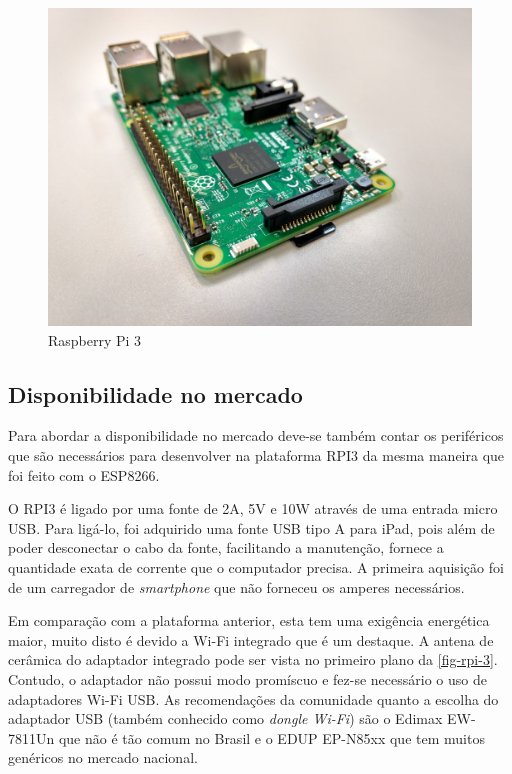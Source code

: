 \begin{figure}[htb]
	\caption{\label{fig-rpi-3}Raspberry Pi 3 }
	\begin{center}
		\includegraphics[width=1\textwidth]{040-plataformas/RPi-WiFi-dongles/rpi-onboard.jpg}
	\end{center}
\end{figure}



\subsection{Disponibilidade no mercado}
\label{subsec:mercado-rpi}

Para abordar a disponibilidade no mercado deve-se também contar os periféricos
que são necessários para desenvolver na plataforma RPI3 da mesma maneira que
foi feito com o ESP8266.

O RPI3 é ligado por uma fonte de 2A, 5V e 10W através de uma entrada micro
USB. Para ligá-lo, foi adquirido uma fonte USB tipo A para iPad, pois além de
poder desconectar o cabo da fonte, facilitando a manutenção, fornece a
quantidade exata de corrente que o computador precisa. A primeira aquisição foi
de um carregador de \emph{smartphone} que não forneceu os amperes necessários.

Em comparação com a plataforma anterior, esta tem uma exigência energética maior,
muito disto é devido a Wi-Fi integrado que é um destaque.
A antena de cerâmica do adaptador integrado pode ser vista no primeiro plano da
\autoref{fig-rpi-3}. Contudo, o adaptador não possui modo promíscuo e fez-se
necessário o uso de adaptadores Wi-Fi USB. As recomendações da comunidade
quanto a escolha do adaptador USB (também conhecido como \emph{dongle Wi-Fi})
são o Edimax EW-7811Un que não é tão comum no Brasil e o
EDUP EP-N85xx que tem muitos genéricos no mercado nacional.

